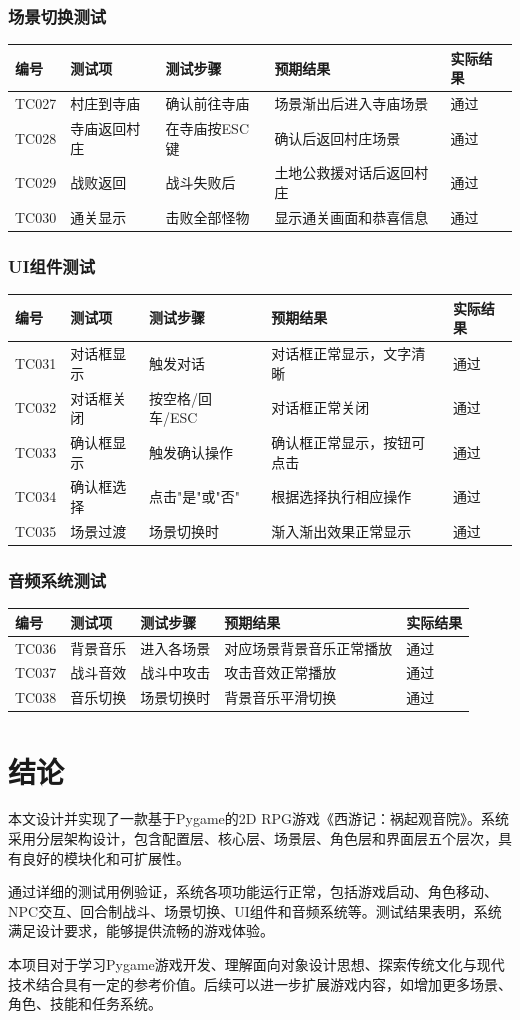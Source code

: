 \documentclass[a4paper,12pt]{article}
\begin{document}
\subsubsection{场景切换测试}
\begin{longtable}{|p{1.5cm}|p{3cm}|p{4cm}|p{4cm}|p{2cm}|}
\hline
编号 & 测试项 & 测试步骤 & 预期结果 & 实际结果 \\
\hline
TC027 & 村庄到寺庙 & 确认前往寺庙 & 场景渐出后进入寺庙场景 & 通过 \\
\hline
TC028 & 寺庙返回村庄 & 在寺庙按ESC键 & 确认后返回村庄场景 & 通过 \\
\hline
TC029 & 战败返回 & 战斗失败后 & 土地公救援对话后返回村庄 & 通过 \\
\hline
TC030 & 通关显示 & 击败全部怪物 & 显示通关画面和恭喜信息 & 通过 \\
\hline
\end{longtable}

\subsubsection{UI组件测试}
\begin{longtable}{|p{1.5cm}|p{3cm}|p{4cm}|p{4cm}|p{2cm}|}
\hline
编号 & 测试项 & 测试步骤 & 预期结果 & 实际结果 \\
\hline
TC031 & 对话框显示 & 触发对话 & 对话框正常显示，文字清晰 & 通过 \\
\hline
TC032 & 对话框关闭 & 按空格/回车/ESC & 对话框正常关闭 & 通过 \\
\hline
TC033 & 确认框显示 & 触发确认操作 & 确认框正常显示，按钮可点击 & 通过 \\
\hline
TC034 & 确认框选择 & 点击"是"或"否" & 根据选择执行相应操作 & 通过 \\
\hline
TC035 & 场景过渡 & 场景切换时 & 渐入渐出效果正常显示 & 通过 \\
\hline
\end{longtable}

\subsubsection{音频系统测试}
\begin{longtable}{|p{1.5cm}|p{3cm}|p{4cm}|p{4cm}|p{2cm}|}
\hline
编号 & 测试项 & 测试步骤 & 预期结果 & 实际结果 \\
\hline
TC036 & 背景音乐 & 进入各场景 & 对应场景背景音乐正常播放 & 通过 \\
\hline
TC037 & 战斗音效 & 战斗中攻击 & 攻击音效正常播放 & 通过 \\
\hline
TC038 & 音乐切换 & 场景切换时 & 背景音乐平滑切换 & 通过 \\
\hline
\end{longtable}

\section{结论}

本文设计并实现了一款基于Pygame的2D RPG游戏《西游记：祸起观音院》。系统采用分层架构设计，包含配置层、核心层、场景层、角色层和界面层五个层次，具有良好的模块化和可扩展性。

通过详细的测试用例验证，系统各项功能运行正常，包括游戏启动、角色移动、NPC交互、回合制战斗、场景切换、UI组件和音频系统等。测试结果表明，系统满足设计要求，能够提供流畅的游戏体验。

本项目对于学习Pygame游戏开发、理解面向对象设计思想、探索传统文化与现代技术结合具有一定的参考价值。后续可以进一步扩展游戏内容，如增加更多场景、角色、技能和任务系统。
\end{document}
